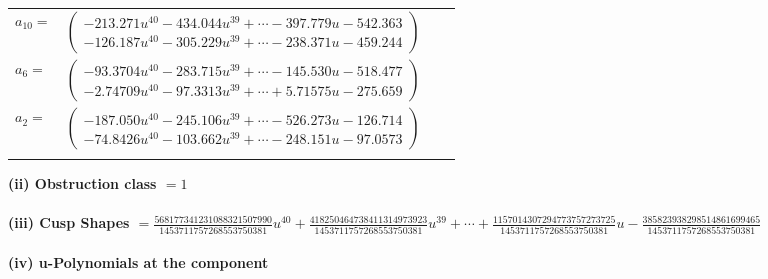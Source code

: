 \documentclass[1p]{elsarticle_modified}
\theoremstyle{definition}
\begin{document}
\begin{tabular}{m{7pt} m{180pt} m{7pt} m{180pt} }
\flushright $a_{10}=$&$\begin{pmatrix}-213.271 u^{40}-434.044 u^{39}+\cdots-397.779 u-542.363\\-126.187 u^{40}-305.229 u^{39}+\cdots-238.371 u-459.244\end{pmatrix}$ \\
\flushright $a_{6}=$&$\begin{pmatrix}-93.3704 u^{40}-283.715 u^{39}+\cdots-145.530 u-518.477\\-2.74709 u^{40}-97.3313 u^{39}+\cdots+5.71575 u-275.659\end{pmatrix}$ \\
\flushright $a_{2}=$&$\begin{pmatrix}-187.050 u^{40}-245.106 u^{39}+\cdots-526.273 u-126.714\\-74.8426 u^{40}-103.662 u^{39}+\cdots-248.151 u-97.0573\end{pmatrix}$\\&\end{tabular}
\flushleft \textbf{(ii) Obstruction class $= 1$}\\~\\
\flushleft \textbf{(iii) Cusp Shapes $= \frac{568177341231088321507990}{1453711757268553750381} u^{40}+\frac{418250464738411314973923}{1453711757268553750381} u^{39}+\cdots+\frac{1157014307294773757273725}{1453711757268553750381} u-\frac{385823938298514861699465}{1453711757268553750381}$}\\~\\
\newpage\renewcommand{\arraystretch}{1}
\flushleft \textbf{(iv) u-Polynomials at the component}\newline \\
\end{document}
